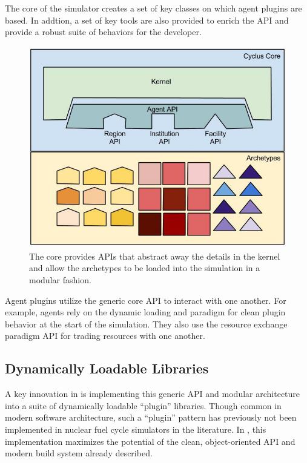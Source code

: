 The core of the \Cyclus simulator creates a set of key classes on which agent plugins 
are based. In addtion, a set of key tools are also provided to enrich the 
\gls{API} and provide a robust suite of behaviors for the developer.


\begin{figure}[htbp!]
\begin{center}
\includegraphics[width=\textwidth]{./images/framework}
\end{center}
\caption{The \Cyclus core provides \gls{API}s that abstract away the details in 
the kernel and allow the archetypes to be loaded into the simulation in a modular 
fashion.}
\label{fig:framework}
\end{figure}

Agent plugins utilize the generic core \gls{API} to interact with one another.  For 
example, agents rely on the dynamic loading and paradigm for clean plugin 
behavior at the start of the simulation. They also use the resource exchange 
paradigm \gls{API} for trading resources with one another. 


\subsection{Dynamically Loadable Libraries}

A key innovation in \Cyclus is implementing this generic \gls{API} and modular 
architecture into a suite of dynamically loadable ``plugin'' libraries.  Though 
common in modern software architecture, such a ``plugin'' pattern has 
previously not been implemented in nuclear fuel cycle simulators in the 
literature.  In \Cyclus, this implementation maximizes the potential of the clean, 
object-oriented \gls{API} and modern build system already described.


